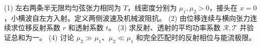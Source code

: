 (1) 左右两条半无限均匀弦张力相同为 \(T\)，线密度分别为 \(\mu_1,\mu_2>0\)，接头在 \(x=0\)，小横波自左方入射。定义两侧波速及机械波阻抗。
(2) 由位移连续与横向张力连续求位移反射系数 \(r\) 和透射系数 \(t\)。
(3) 求反射、透射的平均功率系数 \(\mathcal R,\mathcal T\) 并验证总和为一。
(4) 讨论 \(\mu_2\gg\mu_1\)、\(\mu_2\ll\mu_1\) 和完全匹配时的反射相位与能流极限。
